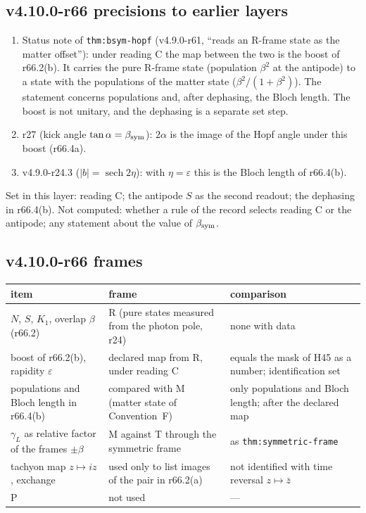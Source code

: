 \subsection*{v4.10.0-r66 precisions to earlier layers}
\label{subsec:v4100-r66-precisions}

\begin{enumerate}[leftmargin=2em]
\item[(a)] Status note of \texttt{thm:bsym-hopf} (v4.9.0-r61, ``reads an R-frame state as the matter offset''): under reading C the map between the
two is the boost of r66.2(b).  It carries the pure R-frame state (population \(\beta^2\) at the antipode) to a state with the populations of the
matter state (\(\beta^2/(1+\beta^2)\)).  The statement concerns populations and, after dephasing, the Bloch length.  The boost is not unitary, and the
dephasing is a separate set step.
\item[(b)] r27 (kick angle \(\tan\alpha=\beta_{\rm sym}\)): \(2\alpha\) is the image of the Hopf angle under this boost (r66.4a).
\item[(c)] v4.9.0-r24.3 (\(|b|=\operatorname{sech}2\eta\)): with \(\eta=\varepsilon\) this is the Bloch length of r66.4(b).
\end{enumerate}
Set in this layer: reading C; the antipode \(S\) as the second readout; the dephasing in r66.4(b).  Not computed: whether a rule of the record selects
reading C or the antipode; any statement about the value of \(\beta_{\rm sym}\).

\subsection*{v4.10.0-r66 frames}
\label{subsec:v4100-r66-frames}

\begin{center}
\small
\begin{tabular}{@{}>{\raggedright\arraybackslash}p{}>{\raggedright\arraybackslash}p{}>{\raggedright\arraybackslash}p{}@{}}
\toprule
item & frame & comparison\\
\midrule
\(N\), \(S\), \(K_1\), overlap \(\beta\) (r66.2) & R (pure states measured from the photon pole, r24) & none with data\\
boost of r66.2(b), rapidity \(\varepsilon\) & declared map from R, under reading C & equals the mask of H45 as a number; identification set\\
populations and Bloch length in r66.4(b) & compared with M (matter state of Convention~F) & only populations and Bloch length; after the declared map\\
\(\gamma_L\) as relative factor of the frames \(\pm\beta\) & M against T through the symmetric frame & as \texttt{thm:symmetric-frame}\\
tachyon map \(z\mapsto iz\), exchange & used only to list images of the pair in r66.2(a) & not identified with time reversal \(z\mapsto\bar z\)\\
P & not used & ---\\
\bottomrule
\end{tabular}
\end{center}

